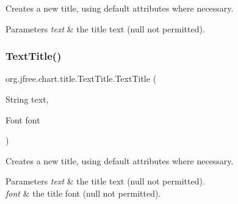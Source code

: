 Creates a new title, using default attributes where necessary.


\begin{DoxyParams}{Parameters}
{\em text} & the title text ({\ttfamily null} not permitted). \\
\hline
\end{DoxyParams}
\mbox{\label{classorg_1_1jfree_1_1chart_1_1title_1_1_text_title_ae7dae37733ae0bea8e204a438ce21413}} 
\subsubsection{\texorpdfstring{Text\+Title()}{TextTitle()}\hspace{0.1cm}{\footnotesize\ttfamily [3/4]}}
{\footnotesize\ttfamily org.\+jfree.\+chart.\+title.\+Text\+Title.\+Text\+Title (\begin{DoxyParamCaption}\item[{String}]{text,  }\item[{Font}]{font }\end{DoxyParamCaption})}

Creates a new title, using default attributes where necessary.


\begin{DoxyParams}{Parameters}
{\em text} & the title text ({\ttfamily null} not permitted). \\
\hline
{\em font} & the title font ({\ttfamily null} not permitted). \\
\hline
\end{DoxyParams}
\mbox{\label{classorg_1_1jfree_1_1chart_1_1title_1_1_text_title_a38bf34a1180edd5cdfaca7fc00568828}} 
